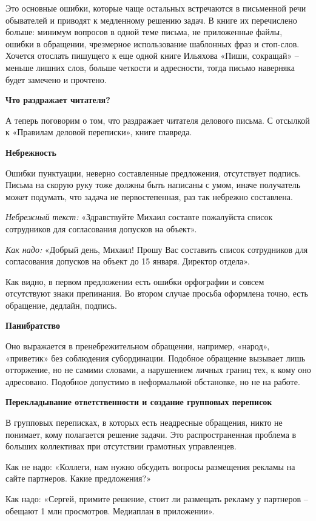 Это основные ошибки, которые чаще остальных встречаются в письменной речи обывателей и приводят к медленному решению задач. В книге их перечислено больше: минимум вопросов в одной теме письма, не приложенные файлы, ошибки в обращении, чрезмерное использование шаблонных фраз и стоп-слов. Хочется отослать пишущего к еще одной книге Ильяхова «Пиши, сокращай» – меньше лишних слов, больше четкости и адресности, тогда письмо наверняка будет замечено и прочтено.

\textbf{Что раздражает читателя?}

А теперь поговорим о том, что раздражает читателя делового письма. С отсылкой к «Правилам деловой переписки», книге главреда.

\textbf{Небрежность}

Ошибки пунктуации, неверно составленные предложения, отсутствует подпись. Письма на скорую руку тоже должны быть написаны с умом, иначе получатель может подумать, что задача не первостепенная, раз так небрежно составлена.

\textit{Небрежный текст:} «Здравствуйте Михаил составте пожалуйста список сотрудников для согласования допусков на объект».

\textit{Как надо:} «Добрый день, Михаил! Прошу Вас составить список сотрудников для согласования допусков на объект до 15 января. Директор отдела».

Как видно, в первом предложении есть ошибки орфографии и совсем отсутствуют знаки препинания. Во втором случае просьба оформлена точно, есть обращение, дедлайн, подпись.

\textbf{Панибратство}

Оно выражается в пренебрежительном обращении, например, «народ», «приветик» без соблюдения субординации. Подобное обращение вызывает лишь отторжение, но не самими словами, а нарушением личных границ тех, к кому оно адресовано. Подобное допустимо в неформальной обстановке, но не на работе.

\textbf{Перекладывание ответственности и создание групповых переписок}

В групповых переписках, в которых есть неадресные обращения, никто не понимает, кому полагается решение задачи. Это распространенная проблема в больших коллективах при отсутствии грамотных управленцев.

Как не надо: «Коллеги, нам нужно обсудить вопросы размещения рекламы на сайте партнеров. Какие предложения?»

Как надо: «Сергей, примите решение, стоит ли размещать рекламу у партнеров – обещают 1 млн просмотров. Медиаплан в приложении».

